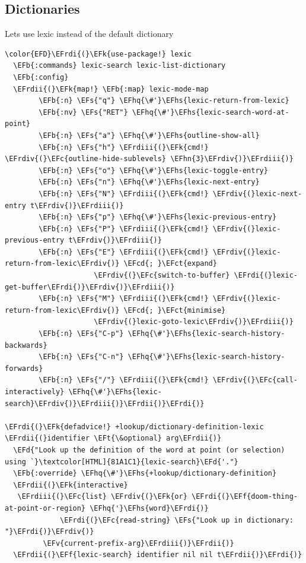 \documentclass{scrartcl}
\newcommand{\EFk}[1]{\textcolor{EFk}{#1}} %
\newcommand{\EFd}[1]{\textcolor{EFd}{#1}} %
\newcommand{\EFt}[1]{\textcolor{EFt}{#1}} %
\newcommand{\EFs}[1]{\textcolor{EFs}{#1}} %
\newcommand{\EFb}[1]{\textcolor{EFb}{#1}} %
\newcommand{\EFct}[1]{\textcolor{EFct}{#1}} %
\newcommand{\EFc}[1]{\textcolor{EFc}{#1}} %
\newcommand{\EFv}[1]{\textcolor{EFv}{#1}} %
\newcommand{\EFf}[1]{\textcolor{EFf}{#1}} %
\newcommand{\EFcd}[1]{\textcolor{EFcd}{#1}} %
\newcommand{\EFhn}[1]{#1} %
\newcommand{\EFhq}[1]{#1} %
\newcommand{\EFhs}[1]{#1} %
\newcommand{\EFrdi}[1]{#1} %
\newcommand{\EFrdii}[1]{#1} %
\newcommand{\EFrdiii}[1]{#1} %
\newcommand{\EFrdiv}[1]{#1} %
\begin{document}
\subsection{Dictionaries}
\label{sec:org6690a9a}
Lets use lexic instead of the default dictionary
\begin{Code}
\begin{Verbatim}[]
\color{EFD}\EFrdi{(}\EFk{use-package!} lexic
  \EFb{:commands} lexic-search lexic-list-dictionary
  \EFb{:config}
  \EFrdii{(}\EFk{map!} \EFb{:map} lexic-mode-map
        \EFb{:n} \EFs{"q"} \EFhq{\#'}\EFhs{lexic-return-from-lexic}
        \EFb{:nv} \EFs{"RET"} \EFhq{\#'}\EFhs{lexic-search-word-at-point}
        \EFb{:n} \EFs{"a"} \EFhq{\#'}\EFhs{outline-show-all}
        \EFb{:n} \EFs{"h"} \EFrdiii{(}\EFk{cmd!} \EFrdiv{(}\EFc{outline-hide-sublevels} \EFhn{3}\EFrdiv{)}\EFrdiii{)}
        \EFb{:n} \EFs{"o"} \EFhq{\#'}\EFhs{lexic-toggle-entry}
        \EFb{:n} \EFs{"n"} \EFhq{\#'}\EFhs{lexic-next-entry}
        \EFb{:n} \EFs{"N"} \EFrdiii{(}\EFk{cmd!} \EFrdiv{(}lexic-next-entry t\EFrdiv{)}\EFrdiii{)}
        \EFb{:n} \EFs{"p"} \EFhq{\#'}\EFhs{lexic-previous-entry}
        \EFb{:n} \EFs{"P"} \EFrdiii{(}\EFk{cmd!} \EFrdiv{(}lexic-previous-entry t\EFrdiv{)}\EFrdiii{)}
        \EFb{:n} \EFs{"E"} \EFrdiii{(}\EFk{cmd!} \EFrdiv{(}lexic-return-from-lexic\EFrdiv{)} \EFcd{; }\EFct{expand}
                     \EFrdiv{(}\EFc{switch-to-buffer} \EFrdi{(}lexic-get-buffer\EFrdi{)}\EFrdiv{)}\EFrdiii{)}
        \EFb{:n} \EFs{"M"} \EFrdiii{(}\EFk{cmd!} \EFrdiv{(}lexic-return-from-lexic\EFrdiv{)} \EFcd{; }\EFct{minimise}
                     \EFrdiv{(}lexic-goto-lexic\EFrdiv{)}\EFrdiii{)}
        \EFb{:n} \EFs{"C-p"} \EFhq{\#'}\EFhs{lexic-search-history-backwards}
        \EFb{:n} \EFs{"C-n"} \EFhq{\#'}\EFhs{lexic-search-history-forwards}
        \EFb{:n} \EFs{"/"} \EFrdiii{(}\EFk{cmd!} \EFrdiv{(}\EFc{call-interactively} \EFhq{\#'}\EFhs{lexic-search}\EFrdiv{)}\EFrdiii{)}\EFrdii{)}\EFrdi{)}

\EFrdi{(}\EFk{defadvice!} +lookup/dictionary-definition-lexic \EFrdii{(}identifier \EFt{\&optional} arg\EFrdii{)}
  \EFd{"Look up the definition of the word at point (or selection) using `}\textcolor[HTML]{81A1C1}{lexic-search}\EFd{'."}
  \EFb{:override} \EFhq{\#'}\EFhs{+lookup/dictionary-definition}
  \EFrdii{(}\EFk{interactive}
   \EFrdiii{(}\EFc{list} \EFrdiv{(}\EFk{or} \EFrdi{(}\EFf{doom-thing-at-point-or-region} \EFhq{'}\EFhs{word}\EFrdi{)}
             \EFrdi{(}\EFc{read-string} \EFs{"Look up in dictionary: "}\EFrdi{)}\EFrdiv{)}
         \EFv{current-prefix-arg}\EFrdiii{)}\EFrdii{)}
  \EFrdii{(}\EFf{lexic-search} identifier nil nil t\EFrdii{)}\EFrdi{)}
\end{Verbatim}
\end{Code}
\end{document}
